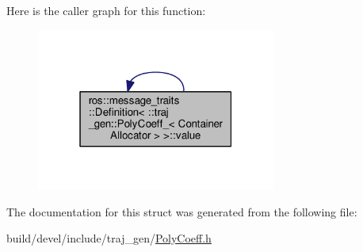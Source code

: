 Here is the caller graph for this function\+:
\nopagebreak
\begin{figure}[H]
\begin{center}
\leavevmode
\includegraphics[width=223pt]{structros_1_1message__traits_1_1_definition_3_01_1_1traj__gen_1_1_poly_coeff___3_01_container_allocator_01_4_01_4_a6cc5c00e3fd2db1f1877e717365cc341_icgraph}
\end{center}
\end{figure}




The documentation for this struct was generated from the following file\+:\begin{DoxyCompactItemize}
\item 
build/devel/include/traj\+\_\+gen/\hyperlink{_poly_coeff_8h}{Poly\+Coeff.\+h}\end{DoxyCompactItemize}
